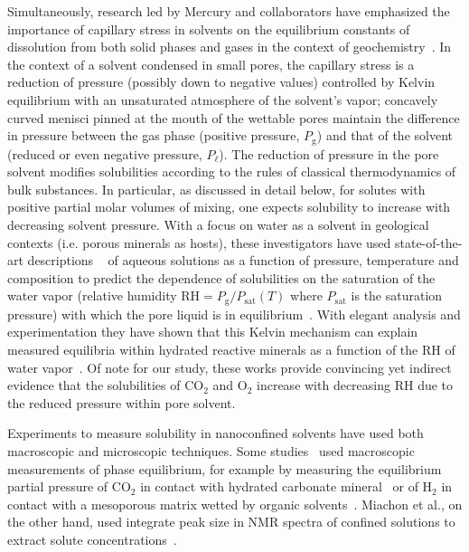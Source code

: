 \documentclass[aps,prl,twocolumn,superscriptaddress,groupedaddress]{revtex4}
\begin{document}
Simultaneously, research led by Mercury and collaborators have emphasized the importance of capillary stress in solvents on the equilibrium constants of dissolution from both solid phases and gases in the context of geochemistry~\cite{thesis_Mercury,mercury_1997a,lassin_2005,pettenati_2008}. In the context of a solvent condensed in small pores, the capillary stress is a reduction of pressure (possibly down to negative values) controlled by Kelvin equilibrium with an unsaturated atmosphere of the solvent's vapor; concavely curved menisci pinned at the mouth of the wettable pores maintain the difference in pressure between the gas phase (positive pressure, $P_\text{g}$) and that of the solvent (reduced or even negative pressure, $P_\ell$). The reduction of pressure in the pore solvent modifies solubilities according to the rules of classical thermodynamics of bulk substances. In particular, as discussed in detail below, for solutes with positive partial molar volumes of mixing, one expects solubility to increase with decreasing solvent pressure. With a focus on water as a solvent in geological contexts (i.e. porous minerals as hosts), these investigators have used state-of-the-art descriptions ~\cite{helgeson_1981} of aqueous solutions as a function of pressure, temperature and composition to predict the dependence of solubilities on the saturation of the water vapor (relative humidity $\mathrm{RH} = P_\text{g}/P_\text{sat}(T)$ where $P_\text{sat}$ is the saturation pressure) with which the pore liquid is in equilibrium~\cite{mercury_2003}. With elegant analysis and experimentation they have shown that this Kelvin mechanism can explain measured equilibria within hydrated reactive minerals as a function of the $\mathrm{RH}$ of water vapor~\cite{lassin_2005,lassin_2016}. Of note for our study, these works provide convincing yet indirect evidence that the solubilities of $\mathrm{CO_2}$ and $\mathrm{O_2}$ increase with decreasing $\mathrm{RH}$ due to the reduced pressure within pore solvent.

Experiments to measure solubility in nanoconfined solvents have used both macroscopic and microscopic techniques. Some studies~\cite{lassin_2005,lassin_2016,ho_2011,ho_2013,ho_2015,thesis_clauzier,clauzier_2012,peratitus_2009b} used macroscopic measurements of phase equilibrium, for example by measuring the equilibrium partial pressure of $\mathrm{CO_2}$ in contact with hydrated carbonate mineral~\cite{lassin_2016} or of $\mathrm{H_2}$ in contact with a mesoporous matrix wetted by organic solvents~\cite{clauzier_2012,peratitus_2009b}. Miachon et al., on the other hand, used integrate peak size in NMR spectra of confined solutions to extract solute concentrations~\cite{miachon_2008}.
\end{document}
